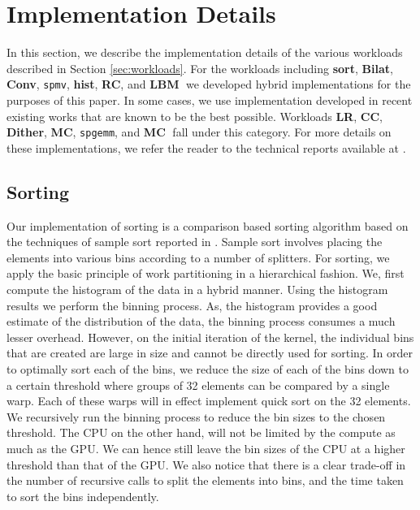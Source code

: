 \documentclass[11pt]{article}
\newcommand{\sgemm} {{\tt spgemm}}
\newcommand{\spmv} {{\tt spmv}}
\newcommand{\bilat} {{\bf Bilat}}
\newcommand{\conv} {{\bf Conv}}
\newcommand{\hist} {{\bf hist}}
\newcommand{\sort} {{\bf sort}}
\newcommand{\LR} {{\bf LR}}
\newcommand{\CC} {{\bf CC}}
\newcommand{\RC} {{\bf RC}}
\newcommand{\MC} {{\bf MC}}
\newcommand{\Dither} {{\bf Dither}}
\newcommand{\LBM} {{\bf LBM}}
\begin{document}
\section{Implementation Details}
\label{sec:impl} 
In this section, we describe the implementation details of the various
workloads described in Section \ref{sec:workloads}. For the workloads
including \sort, \bilat, \conv, \spmv, \hist,
\RC, and \LBM$\;$ we developed hybrid implementations for the  purposes of
this paper. In some cases, we use implementation developed in recent existing
works that are known to be the
best possible. Workloads \LR, \CC, \Dither, \MC, \sgemm, and \MC$\;$ fall under this
category.   For more details on these implementations, we refer the reader
to the technical reports available at \cite{url}.


\subsection{Sorting}

Our implementation of sorting is a comparison based sorting
algorithm based on the techniques of sample sort reported in
\cite{sanders10}. Sample sort involves placing the elements into various
bins according to a number of splitters.
For sorting, we apply the basic principle of work partitioning
in a hierarchical fashion. We, first compute the histogram of
the data in a hybrid manner. Using the histogram results we
perform the binning process. As, the histogram provides a good
estimate of the distribution of the data, the binning process
consumes a much lesser overhead. However, on the initial iteration
of the kernel, the individual bins that are created are large in size
and cannot be directly used for sorting. 
In order to optimally sort each of the bins, we  reduce the size of
each of the bins down to a certain threshold where groups of 32
elements can be compared by a single warp. Each of these warps will in effect
implement quick sort on the 32 elements. We recursively run the binning
process to reduce the bin sizes to the chosen threshold.  The CPU on
the other hand,
will not be limited by the compute as much as the GPU. We can hence
still leave the bin
sizes of the CPU at a higher threshold than that of the GPU. 
We also notice that there is a clear
trade-off in the number of recursive calls to split the elements
into bins, and the time taken to sort the bins independently.
\end{document}
